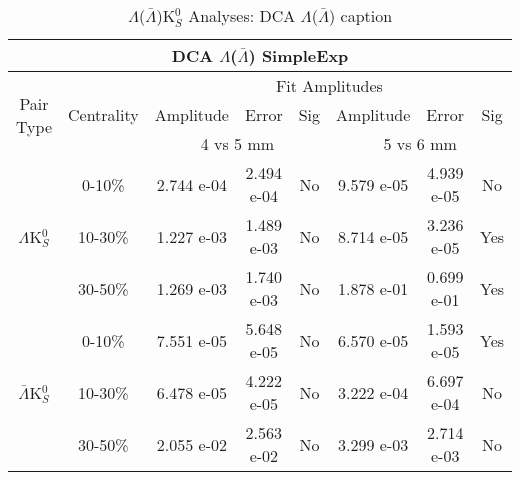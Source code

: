 \documentclass[../AnalysisNoteJBuxton.tex]{subfiles}
\begin{document}
\begin{table}
 \centering
 \begin{tabular}{|c|c|c|c|c||c|c|c|}
  \multicolumn{8}{c}{DCA $\Lambda$($\bar{\Lambda}$) SimpleExp} \\
  \hline
  \multirow{3}{*}{Pair Type} & \multirow{3}{*}{Centrality} & \multicolumn{6}{c|}{Fit Amplitudes} \\
  \cline{3-8}
   & & Amplitude & Error & Sig & Amplitude & Error & Sig \\
  \cline{3-8}
   & & \multicolumn{3}{c||}{4 vs 5 mm} & \multicolumn{3}{c|}{5 vs 6 mm} \\
  \hline  
  \multirow{3}{*}{$\Lambda$K$^{0}_{S}$}  
   &  0-10\% & 2.744 e-04 & 2.494 e-04 & No & 9.579 e-05 & 4.939 e-05 & No \\
   & 10-30\% & 1.227 e-03 & 1.489 e-03 & No & 8.714 e-05 & 3.236 e-05 & Yes \\
   & 30-50\% & 1.269 e-03 & 1.740 e-03 & No & 1.878 e-01 & 0.699 e-01 & Yes \\
  \hline  
  \multirow{3}{*}{$\bar{\Lambda}$K$^{0}_{S}$}  
   &  0-10\% & 7.551 e-05 & 5.648 e-05 & No & 6.570 e-05 & 1.593 e-05 & Yes \\
   & 10-30\% & 6.478 e-05 & 4.222 e-05 & No & 3.222 e-04 & 6.697 e-04 & No \\
   & 30-50\% & 2.055 e-02 & 2.563 e-02 & No & 3.299 e-03 & 2.714 e-03 & No \\
  \hline
 \end{tabular}
 \caption{$\Lambda$($\bar{\Lambda}$)K$^{0}_{S}$ Analyses: DCA $\Lambda$($\bar{\Lambda}$) caption}
 \label{tab:LamDcaLamK0_SimpleExp}
\end{table}
\end{document}

